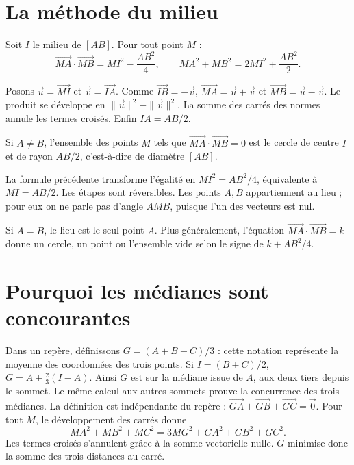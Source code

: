 \documentclass[../cours_1re.tex]{subfiles}
\begin{document}
\section{La méthode du milieu}
Soit $I$ le milieu de $[AB]$. Pour tout point $M$ :
\[
\overrightarrow{MA}\cdot\overrightarrow{MB}
=MI^2-\frac{AB^2}{4},\qquad
MA^2+MB^2=2MI^2+\frac{AB^2}{2}.
\]
\begin{demonstration}
Posons $\vec u=\overrightarrow{MI}$ et $\vec v=\overrightarrow{IA}$.
Comme $\overrightarrow{IB}=-\vec v$,
$\overrightarrow{MA}=\vec u+\vec v$ et
$\overrightarrow{MB}=\vec u-\vec v$.
Le produit se développe en $\|\vec u\|^2-\|\vec v\|^2$.
La somme des carrés des normes annule les termes croisés.
Enfin $IA=AB/2$.
\end{demonstration}
\begin{theoreme}
Si $A\ne B$, l'ensemble des points $M$ tels que
$\overrightarrow{MA}\cdot\overrightarrow{MB}=0$ est le cercle
de centre $I$ et de rayon $AB/2$, c'est-à-dire de diamètre $[AB]$.
\end{theoreme}
\begin{demonstration}
La formule précédente transforme l'égalité en $MI^2=AB^2/4$,
équivalente à $MI=AB/2$. Les étapes sont réversibles.
Les points $A,B$ appartiennent au lieu ; pour eux on ne parle pas d'angle
$AMB$, puisque l'un des vecteurs est nul.
\end{demonstration}
Si $A=B$, le lieu est le seul point $A$.
Plus généralement, l'équation
$\overrightarrow{MA}\cdot\overrightarrow{MB}=k$
donne un cercle, un point ou l'ensemble vide selon le signe de $k+AB^2/4$.

\section{Pourquoi les médianes sont concourantes}
\approfondissement
Dans un repère, définissons $G=(A+B+C)/3$ : cette notation représente
la moyenne des coordonnées des trois points. Si $I=(B+C)/2$,
$G=A+\frac23(I-A)$. Ainsi $G$ est sur la médiane issue de $A$,
aux deux tiers depuis le sommet. Le même calcul aux autres sommets prouve
la concurrence des trois médianes. La définition est indépendante du repère :
$\overrightarrow{GA}+\overrightarrow{GB}+\overrightarrow{GC}=\vec0$.
Pour tout $M$, le développement des carrés donne
\[
MA^2+MB^2+MC^2=3MG^2+GA^2+GB^2+GC^2.
\]
Les termes croisés s'annulent grâce à la somme vectorielle nulle.
$G$ minimise donc la somme des trois distances au carré.
\end{document}
